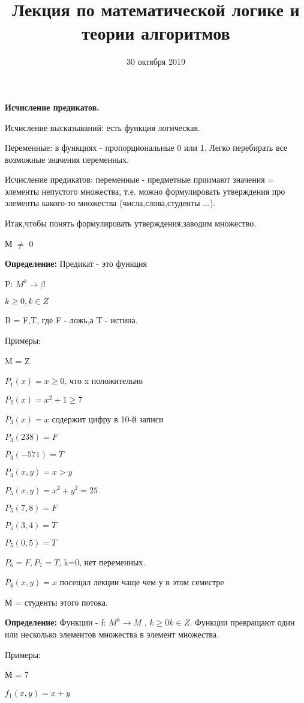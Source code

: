 \documentclass{article}
\title{Лекция по математической логике и теории алгоритмов}
\date{30 октября 2019}
\begin{document}
\maketitle
\begin{center}
\textbf{Исчисление предикатов.}
\end{center}

Исчисление высказываний: есть функция логическая.

Переменные: в функциях - пропорциональные 0 или 1. Легко перебирать все возможные значения переменных.

Исчисление предикатов: переменные - предметные приимают значения = элементы непустого множества, т.е. можно формулировать утверждения про элементы какого-то множества (числа,слова,студенты ...).

Итак,чтобы понять формулировать утверждения,заводим множество.

М $\not =$ 0

\textbf{Определение:} Предикат - это функция 

P: $M^k \longrightarrow \beta$ 

$k \geq 0 , k\in Z$

B = {F,T}, где F - ложь,а T - истина.

Примеры:

M = Z

$P_1 (x) = x \geq 0$, что x положительно

$P_2 (x) = x^2 + 1 \geq 7$

$P_3 (x) = x$ содержит цифру в 10-й записи

$P_3 (238) = F$

$P_3 (-571) = T$

$P_4(x,y) = x > y$

$P_5(x,y) = x^2 + y^2 = 25$

$P_5(7,8) = F$

$P_5(3,4) = T$

$P_5(0,5) = T$

$P_6 = F , P_7 = T$, k=0, нет переменных.

$P_8(x,y) = x$ посещал лекции чаще чем у в этом семестре

М = студенты этого потока.

\textbf{Определение:} Функции - f: $M^k \longrightarrow M$ , $k \geq 0 k \in Z$. Функции превращают один или несколько элементов множества в элемент множества.

Примеры:

М = 7

$f_1(x,y) = x + y$
\end{document}

